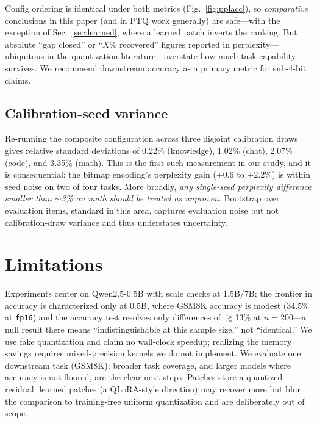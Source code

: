 \documentclass[manuscript, screen, review]{jair}
\newcommand{\code}[1]{\texttt{#1}}
\begin{document}
Config ordering is identical under both metrics (Fig.~\ref{fig:pplacc}), so
\emph{comparative} conclusions in this paper (and in PTQ work generally) are
safe---with the exception of Sec.~\ref{sec:learned}, where a learned patch
inverts the ranking. But absolute ``gap closed'' or ``$X\%$ recovered''
figures reported in perplexity---ubiquitous in the quantization
literature---overstate how much task capability survives. We recommend
downstream accuracy as a primary metric for sub-4-bit claims.

\subsection{Calibration-seed variance}
Re-running the composite configuration across three disjoint calibration draws
gives relative standard deviations of 0.22\% (knowledge), 1.02\% (chat), 2.07\%
(code), and 3.35\% (math). This is the first such measurement in our study, and
it is consequential: the bitmap encoding's perplexity gain ($+0.6$ to $+2.2\%$)
is within seed noise on two of four tasks. More broadly, \emph{any single-seed
perplexity difference smaller than $\sim$3\% on math should be treated as
unproven}. Bootstrap over evaluation items, standard in this area, captures
evaluation noise but not calibration-draw variance and thus understates
uncertainty.

\section{Limitations}
Experiments center on Qwen2.5-0.5B with scale checks at 1.5B/7B; the frontier
in accuracy is characterized only at 0.5B, where GSM8K accuracy is modest
(34.5\% at \code{fp16}) and the accuracy test resolves only differences of
$\gtrsim$13\% at $n{=}200$---a null result there means ``indistinguishable at
this sample size,'' not ``identical.'' We use fake quantization and claim no
wall-clock speedup; realizing the memory savings requires mixed-precision
kernels we do not implement. We evaluate one downstream task (GSM8K);
broader task coverage, and larger models where accuracy is not floored, are
the clear next steps. Patches store a quantized residual; learned patches
(a QLoRA-style direction) may recover more but blur the comparison to
training-free uniform quantization and are deliberately out of scope.
\end{document}
